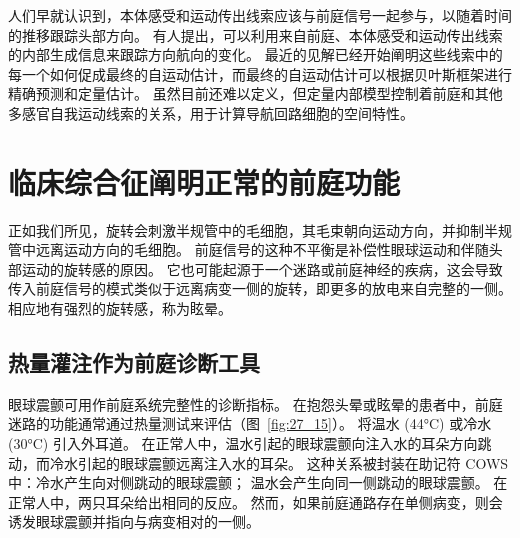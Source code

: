 人们早就认识到，本体感受和运动传出线索应该与前庭信号一起参与，以随着时间的推移跟踪头部方向。
有人提出，可以利用来自前庭、本体感受和运动传出线索的内部生成信息来跟踪方向航向的变化。
最近的见解已经开始阐明这些线索中的每一个如何促成最终的自运动估计，而最终的自运动估计可以根据贝叶斯框架进行精确预测和定量估计。
虽然目前还难以定义，但定量内部模型控制着前庭和其他多感官自我运动线索的关系，用于计算导航回路细胞的空间特性。




\section{临床综合征阐明正常的前庭功能}

正如我们所见，旋转会刺激半规管中的毛细胞，其毛束朝向运动方向，并抑制半规管中远离运动方向的毛细胞。
前庭信号的这种不平衡是补偿性眼球运动和伴随头部运动的旋转感的原因。
它也可能起源于一个迷路或前庭神经的疾病，这会导致传入前庭信号的模式类似于远离病变一侧的旋转，即更多的放电来自完整的一侧。
相应地有强烈的旋转感，称为眩晕。



\subsection{热量灌注作为前庭诊断工具}

眼球震颤可用作前庭系统完整性的诊断指标。
在抱怨头晕或眩晕的患者中，前庭迷路的功能通常通过热量测试来评估（图~\ref{fig:27_15}）。
将温水 (44°C) 或冷水 (30°C) 引入外耳道。
在正常人中，温水引起的眼球震颤向注入水的耳朵方向跳动，而冷水引起的眼球震颤远离注入水的耳朵。
这种关系被封装在助记符 COWS 中：冷水产生向对侧跳动的眼球震颤；
温水会产生向同一侧跳动的眼球震颤。
在正常人中，两只耳朵给出相同的反应。
然而，如果前庭通路存在单侧病变，则会诱发眼球震颤并指向与病变相对的一侧。


